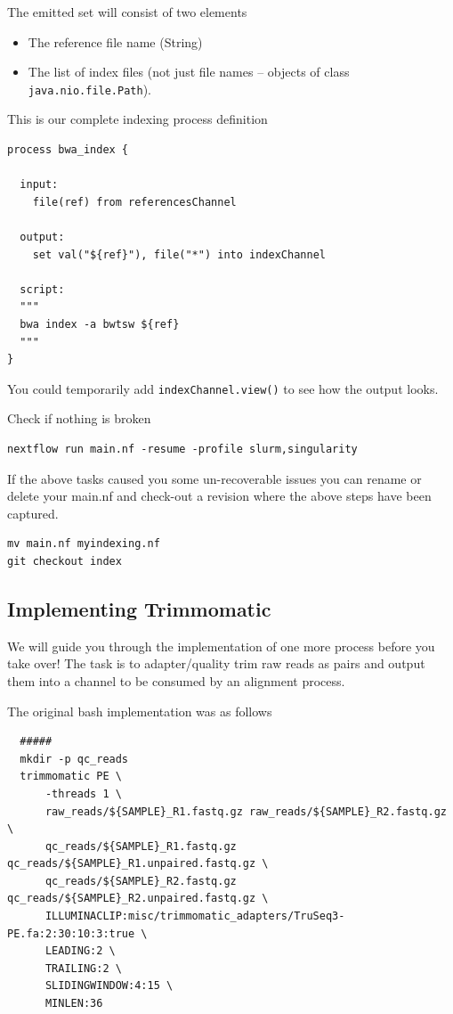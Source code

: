 The emitted set will consist of two elements 
\begin{itemize}
\item The reference file name (String) 
\item The list of index files (not just file names -- objects of class \texttt{java.nio.file.Path}).
\end{itemize}

This is our complete indexing process definition 
\begin{lstlisting}
process bwa_index {
  
  input:
    file(ref) from referencesChannel
  
  output:
    set val("${ref}"), file("*") into indexChannel 
    
  script:
  """
  bwa index -a bwtsw ${ref}
  """
}  
\end{lstlisting}

You could temporarily add  \texttt{indexChannel.view()} to see how the output looks. 


\begin{steps}
Check if nothing is broken 
\begin{lstlisting}
nextflow run main.nf -resume -profile slurm,singularity
\end{lstlisting}
\end{steps}

\begin{note}
If the above tasks caused you some un-recoverable issues you can rename or delete your main.nf and check-out a revision where the above steps have been captured.
\begin{lstlisting}
mv main.nf myindexing.nf
git checkout index
\end{lstlisting}
\end{note}


\subsection{Implementing Trimmomatic}

We will guide you through the implementation of one more process before you take over!
The task is to adapter/quality trim raw reads as pairs and output them into a channel 
to be consumed by an alignment process.

The original bash implementation was as follows

\begin{lstlisting}
  #####
  mkdir -p qc_reads
  trimmomatic PE \
      -threads 1 \
      raw_reads/${SAMPLE}_R1.fastq.gz raw_reads/${SAMPLE}_R2.fastq.gz \
      qc_reads/${SAMPLE}_R1.fastq.gz qc_reads/${SAMPLE}_R1.unpaired.fastq.gz \
      qc_reads/${SAMPLE}_R2.fastq.gz qc_reads/${SAMPLE}_R2.unpaired.fastq.gz \
      ILLUMINACLIP:misc/trimmomatic_adapters/TruSeq3-PE.fa:2:30:10:3:true \
      LEADING:2 \
      TRAILING:2 \
      SLIDINGWINDOW:4:15 \
      MINLEN:36
\end{lstlisting}

